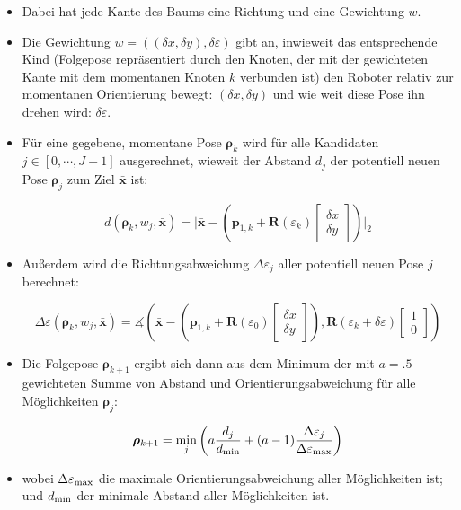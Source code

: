 \documentclass[10pt,a4paper]{article}
\begin{document}
\begin{itemize}
	\item Dabei hat jede Kante des Baums eine Richtung und eine Gewichtung $w$.

	\item Die Gewichtung $w = ((\delta x, \delta y), \delta \varepsilon)$ gibt an, inwieweit das entsprechende Kind (Folgepose repräsentiert durch den Knoten, der mit der gewichteten Kante mit dem momentanen Knoten $k$ verbunden ist) den Roboter relativ zur momentanen Orientierung bewegt: $(\delta x, \delta y)$ und wie weit diese Pose ihn drehen wird: $\delta \varepsilon$.

	\item Für eine gegebene, momentane Pose $\bm{\rho}_k$ wird für alle Kandidaten $j \in [0,\cdots,J-1]$ ausgerechnet, wieweit der Abstand $d_j$ der potentiell neuen Pose $\bm{\rho}_j$ zum Ziel $\bar{\bm{x}}$ ist:

	\begin{equation}
	d(\bm{\rho}_k, w_j, \bar{\bm{x}}) = \bigg| \bar{\bm{x}} - \left(\bm{p}_{1,k} + \bm{R}(\varepsilon_k)\begin{bmatrix}
	\delta x \\ \delta y
\end{bmatrix}	 \right)\bigg|_2
	\end{equation}	
	
	\item Außerdem wird die Richtungsabweichung $\Delta \varepsilon_j$ aller potentiell neuen Pose $j$ berechnet:
	
	\begin{equation}
	\Delta \varepsilon (\bm{\rho}_k, w_j, \bar{\bm{x}}) = \measuredangle\left( \bar{\bm{x}} - \left(\bm{p}_{1,k} + \bm{R}(\varepsilon_0)\begin{bmatrix}
	\delta x \\ \delta y
\end{bmatrix} \right), \bm{R}(\varepsilon_k + \delta \varepsilon) \begin{bmatrix}
1 \\ 0
\end{bmatrix} \right)
	\end{equation}

	\item Die Folgepose $\bm{\rho}_{k+1}$ ergibt sich dann aus dem Minimum der mit $a=.5$ gewichteten Summe von Abstand und Orientierungsabweichung für alle Möglichkeiten $\bm{\rho}_{j}$:
	
	\begin{equation}
	\bm{\rho}_{k+1} = \min_j \left( a \frac{d_j}{d_{\textnormal{min}}}  + (a-1)\frac{\Delta \varepsilon_j}{\Delta \varepsilon_{\textnormal{max}}} \right)
	\end{equation}

	\item wobei $\Delta \varepsilon_{\textnormal{max}}$ die maximale Orientierungsabweichung aller Möglichkeiten ist; und $d_{\textnormal{min}}$ der minimale Abstand aller Möglichkeiten ist.

\end{itemize}
\end{document}
